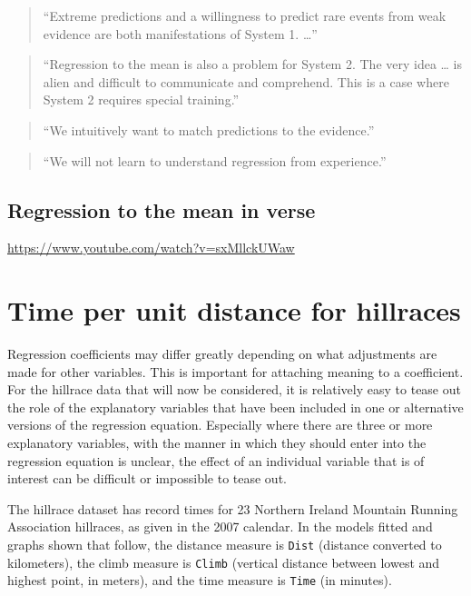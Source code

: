 \documentclass[
  10ptls,
  b5paper]{book}
\begin{document}
\begin{quote}
``Extreme predictions and a willingness to predict rare events from weak evidence are both manifestations of System 1. \ldots{}''
\end{quote}

\begin{quote}
``Regression to the mean is also a problem for System 2. The very idea \ldots{} is alien and difficult to communicate and comprehend. This is a case where System 2 requires special training.''
\end{quote}

\begin{quote}
``We intuitively want to match predictions to the evidence.''
\end{quote}

\begin{quote}
``We will not learn to understand regression from experience.''
\end{quote}

\subsection*{Regression to the mean in verse}\label{regression-to-the-mean-in-verse}

\url{https://www.youtube.com/watch?v=sxMllckUWaw}

\section{Time per unit distance for hillraces}\label{time-per-unit-distance-for-hillraces}

Regression coefficients may differ greatly depending on what adjustments are made for other variables. This is important for attaching meaning to a coefficient. For the hillrace data that will now be considered, it is relatively easy to tease out the role of the explanatory variables that have been included in one or alternative versions of the regression equation. Especially where there are three or more explanatory variables, with the manner in which they should enter into the regression equation is unclear, the effect of an individual variable that is of interest can be difficult or impossible to tease out.

The hillrace dataset has record times for 23 Northern Ireland Mountain Running Association hillraces, as given in the 2007 calendar. In the models fitted and graphs shown that follow, the distance measure is \texttt{Dist} (distance converted to kilometers), the climb measure is \texttt{Climb} (vertical distance between lowest and highest point, in meters), and the time measure is \texttt{Time} (in minutes).
\end{document}
